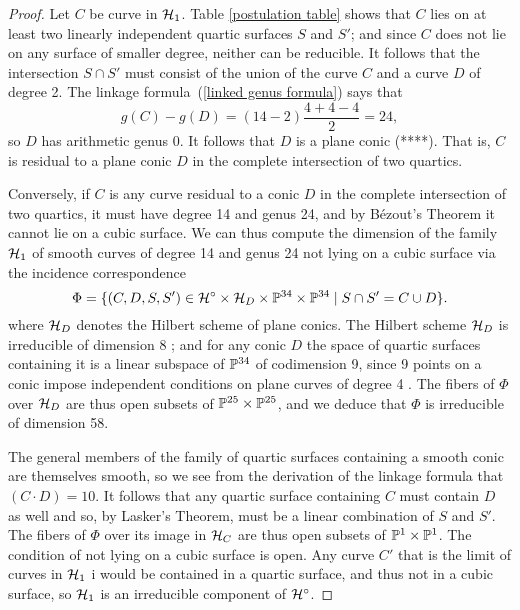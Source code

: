 \begin{proof}
Let $C$ be curve in $\cH_1$. Table \ref{postulation table} shows that $C$ lies on at least two linearly independent quartic surfaces $S$ and $S'$; and since $C$ does not lie on any surface of smaller degree, neither can be reducible. It follows that the intersection $S \cap S'$ must consist of the union of the curve $C$ and a curve $D$ of degree 2. The linkage formula~(\ref{linked genus formula})  says that
$$
g(C) - g(D) = (14 - 2)\frac{4+4-4}{2} = 24,
$$
so $D$ has arithmetic genus 0. It follows that $D$ is a plane conic (****).  That is, $C$ is residual to a plane conic $D$ in the complete intersection of two quartics. 

Conversely, if $C$ is any curve residual to a conic $D$ in the complete intersection of two quartics, it must have degree 14 and genus 24, and by B\'ezout's Theorem it cannot lie on a cubic surface. We can thus compute the dimension of the family $\cH_1$ of smooth curves of degree 14 and genus 24 not lying on a cubic surface via the incidence correspondence
$$
\Phi = \{ (C, D, S, S') \in \cH^\circ \times \cH_D \times \PP^{34} \times \PP^{34} \mid S \cap S' = C \cup D\}.
$$
where $\cH_D$ denotes the Hilbert scheme of plane conics. The Hilbert scheme $\cH_D$ is irreducible of dimension 8 ; and for any conic $D$ the space of quartic surfaces containing it is a linear subspace of $\PP^{34}$ of codimension 9, since 9  points on a conic impose independent conditions on plane curves of degree 4 . The fibers of $\Phi$ over $\cH_D$ are thus open subsets of $\PP^{25} \times \PP^{25}$, and we deduce that $\Phi$ is irreducible of dimension 58. 

The general members of the family of quartic surfaces containing a smooth conic are themselves smooth, so we see from the derivation of the linkage formula that $(C\cdot D) = 10$. It follows that any quartic surface containing $C$ must contain $D$ as well and so, by Lasker's Theorem, must be a linear combination of $S$ and $S'$.   The fibers of $\Phi$ over its image in $\cH_C$ are thus open subsets of $\PP^1 \times \PP^1$. 
The condition of not lying on a cubic surface is open. Any curve $C'$ that is the limit of curves in $\cH_1$ i
would be contained in a quartic surface, and thus not in a cubic surface, so $\cH_1$  is an irreducible component of $\cH^\circ$.


\end{proof}
